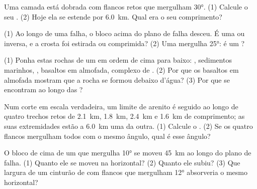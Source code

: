 \begin{exercise}[$\star$]\label{exo:g12:mountain-building:3}
Uma camada está dobrada com flancos retos que mergulham \ang{30}. (1)
Calcule o seu . (2) Hoje ela se estende por \qty{6.0}{km}. Qual
era o seu comprimento?
\end{exercise}

\begin{exercise}[$\star$]\label{exo:g12:mountain-building:4}
(1) Ao longo de uma falha, o bloco acima do plano de falha desceu. É uma
 ou inversa, e a crosta foi estirada ou comprimida?
(2) Uma  mergulha \ang{25}: é um ?
\end{exercise}

\begin{exercise}[$\star$]\label{exo:g12:mountain-building:5}
(1) Ponha estas rochas de um  em ordem de cima para baixo: ,
sedimentos marinhos, , basaltos em almofada, complexo de .
(2) Por que os basaltos em almofada mostram que a rocha se formou debaixo
d'água? (3) Por que se encontram  ao longo das ?
\end{exercise}

\begin{exercise}[$\star\star$]\label{exo:g12:mountain-building:6}
Num corte em escala verdadeira, um limite de arenito é seguido ao longo de
quatro trechos retos de \qty{2.1}{km}, \qty{1.8}{km}, \qty{2.4}{km} e
\qty{1.6}{km} de comprimento; as suas extremidades estão a \qty{6.0}{km}
uma da outra. (1) Calcule o . (2) Se os quatro flancos
mergulham todos com o mesmo ângulo, qual é esse ângulo?
\end{exercise}

\begin{exercise}[$\star\star$]\label{exo:g12:mountain-building:7}
O bloco de cima de um  que mergulha \ang{10} se moveu
\qty{45}{km} ao longo do plano de falha. (1) Quanto ele se moveu na
horizontal? (2) Quanto ele subiu? (3) Que largura de um cinturão de 
com flancos que mergulham \ang{12} absorveria o mesmo 
horizontal?
\end{exercise}

